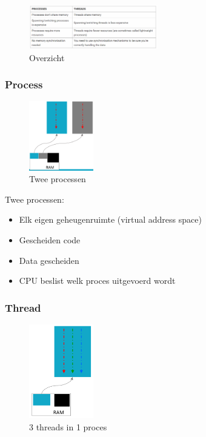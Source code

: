 \documentclass{article}
\begin{document}
\begin{figure}[H]
    \centering
    \includegraphics[width=0.5\textwidth]{threads-processes.png}
    \caption{Overzicht}
\end{figure}


\subsubsection{Process}

\begin{figure}[H]
    \centering
    \includegraphics[width=0.25\textwidth]{process-vs-thread.png}
    \caption{Twee processen}
\end{figure}

Twee processen:

\begin{itemize}
    \item Elk eigen geheugenruimte (virtual address space)
    \item Gescheiden code
    \item Data gescheiden
    \item CPU beslist welk proces uitgevoerd wordt
\end{itemize}

\subsubsection{Thread}

\begin{figure}[H]
    \centering
    \includegraphics[width=0.25\textwidth]{process-vs-thread2.png}
    \caption{3 threads in 1 proces}
\end{figure}
\end{document}
